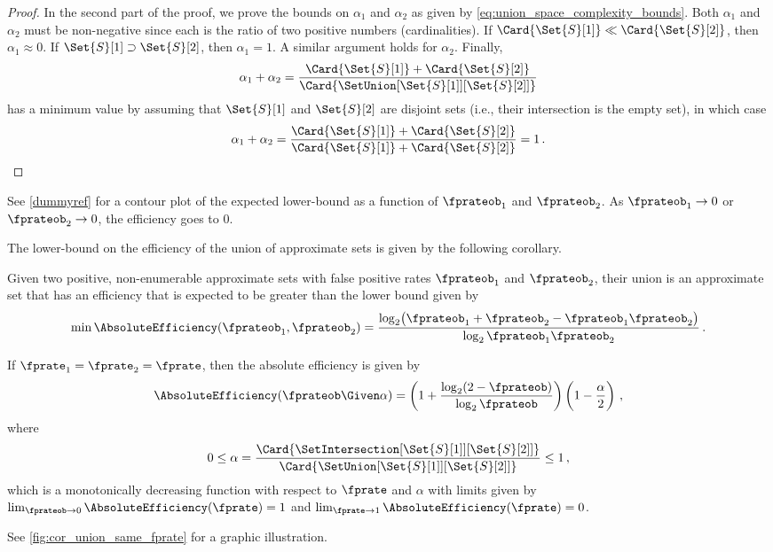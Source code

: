 \documentclass[ ../main.tex]{subfiles}
\begin{document}
\begin{proof}
In the second part of the proof, we prove the bounds on $\alpha_1$ and $\alpha_2$ as given by \cref{eq:union_space_complexity_bounds}.
Both $\alpha_1$ and $\alpha_2$ must be non-negative since each is the ratio of two positive numbers (cardinalities). If $\Card{\Set{S}[1]} \ll \Card{\Set{S}[2]}$, then $\alpha_1 \approx 0$. If $\Set{S}[1] \supset \Set{S}[2]$, then $\alpha_1 = 1$. A similar argument holds for $\alpha_2$. Finally,
\begin{equation}
    \alpha_1 + \alpha_2 = \frac{\Card{\Set{S}[1]} + \Card{\Set{S}[2]}}{\Card{\SetUnion[\Set{S}[1]][\Set{S}[2]]}}
\end{equation}
has a minimum value by assuming that $\Set{S}[1]$ and $\Set{S}[2]$ are disjoint sets (i.e., their intersection is the empty set), in which case
\begin{equation}
    \alpha_1 + \alpha_2 = \frac{\Card{\Set{S}[1]} + \Card{\Set{S}[2]}}{\Card{\Set{S}[1]} + \Card{\Set{S}[2]}} = 1\,.
\end{equation}
\end{proof}
See \cref{dummyref} for a contour plot of the expected lower-bound as a function of $\fprateob_1$ and $\fprateob_2$. As $\fprateob_1 \to 0$ or $\fprateob_2 \to 0$, the efficiency goes to $0$.

The lower-bound on the efficiency of the union of approximate sets is given by the following corollary.
\begin{corollary}
Given two positive, non-enumerable approximate sets with false positive rates $\fprateob_1$ and $\fprateob_2$, their union is an approximate set that has an efficiency that is expected to be greater than the lower bound given by
\begin{equation}
    \min \AbsoluteEfficiency(\fprateob_1, \fprateob_2) = \frac{
        \log_2\!\left(\fprateob_1 + \fprateob_2 - \fprateob_1 \fprateob_2\right)}
    {
        \log_2 \fprateob_1 \fprateob_2
    }\,.
\end{equation}
\end{corollary}


\begin{corollary}
If $\fprate_1 = \fprate_2 = \fprate$, then the absolute efficiency is given by
\begin{equation}
\AbsoluteEfficiency(\fprateob \Given \alpha) = \left(1 + \frac{\log_2(2 - \fprateob)}{\log_2 \fprateob}\right)\left(1 - \frac{\alpha}{2}\right)\,,
\end{equation}
where
\begin{equation}
    0 \leq \alpha = \frac{\Card{\SetIntersection[\Set{S}[1]][\Set{S}[2]]}}{\Card{\SetUnion[\Set{S}[1]][\Set{S}[2]]}} \leq 1\,,
\end{equation}
which is a monotonically decreasing function with respect to $\fprate$ and $\alpha$ with limits given by $\lim_{\fprateob \to 0} \AbsoluteEfficiency(\fprate) = 1$ and $\lim_{\fprate \to 1} \AbsoluteEfficiency(\fprate) = 0$.
\end{corollary}
See \cref{fig:cor_union_same_fprate} for a graphic illustration.
\end{document}
